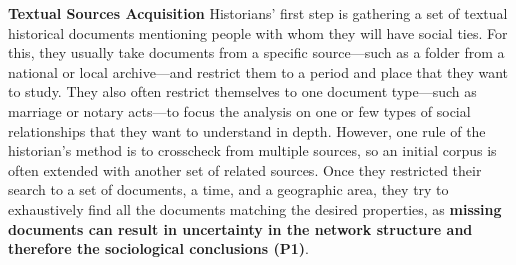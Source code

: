 

\noindent\textbf{Textual Sources Acquisition}
Historians' first step is gathering a set of textual historical documents mentioning people with whom they will have social ties. For this, they usually take documents from a specific source---such as a folder from a national or local archive---and restrict them to a period and place that they want to study. They also often restrict themselves to one document type---such as marriage or notary acts---to focus the analysis on one or few types of social relationships that they want to understand in depth. However, one rule of the historian's method is to crosscheck from multiple sources, so an initial corpus is often extended with another set of related sources.
Once they restricted their search to a set of documents, a time, and a geographic area, they try to exhaustively find all the documents matching the desired properties, as \textbf{missing documents can result in uncertainty in the network structure and therefore the sociological conclusions (P1)}.

